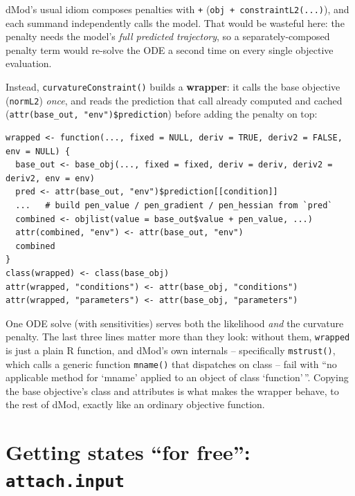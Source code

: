 \documentclass[11pt]{article}
\newcommand{\code}[1]{\texttt{#1}}
\begin{document}
dMod's usual idiom composes penalties with \code{+}
(\code{obj + constraintL2(...)}), and each summand independently calls the
model. That would be wasteful here: the penalty needs the model's
\emph{full predicted trajectory}, so a separately-composed penalty term
would re-solve the ODE a second time on every single objective evaluation.

Instead, \code{curvatureConstraint()} builds a \textbf{wrapper}: it calls
the base objective (\code{normL2}) \emph{once}, and reads the prediction
that call already computed and cached
(\code{attr(base\_out, "env")\$prediction}) before adding the penalty on
top:
\begin{lstlisting}
wrapped <- function(..., fixed = NULL, deriv = TRUE, deriv2 = FALSE, env = NULL) {
  base_out <- base_obj(..., fixed = fixed, deriv = deriv, deriv2 = deriv2, env = env)
  pred <- attr(base_out, "env")$prediction[[condition]]
  ...   # build pen_value / pen_gradient / pen_hessian from `pred`
  combined <- objlist(value = base_out$value + pen_value, ...)
  attr(combined, "env") <- attr(base_out, "env")
  combined
}
class(wrapped) <- class(base_obj)
attr(wrapped, "conditions") <- attr(base_obj, "conditions")
attr(wrapped, "parameters") <- attr(base_obj, "parameters")
\end{lstlisting}
One ODE solve (with sensitivities) serves both the likelihood \emph{and}
the curvature penalty. The last three lines matter more than they look:
without them, \code{wrapped} is just a plain R function, and dMod's own
internals -- specifically \code{mstrust()}, which calls a generic function
\code{mname()} that dispatches on class -- fail with ``no applicable
method for `mname' applied to an object of class `function'\,''. Copying
the base objective's class and attributes is what makes the wrapper behave,
to the rest of dMod, exactly like an ordinary objective function.

\section{Getting states ``for free'': \code{attach.input}}
\end{document}
